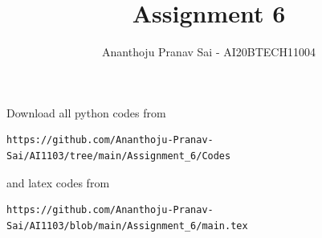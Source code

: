 \documentclass[journal,12pt,twocolumn]{IEEEtran}
\DeclareMathOperator*{\Res}{Res}
\begin{document}
\newcommand{\BEQA}{\begin{eqnarray}}
\newcommand{\EEQA}{\end{eqnarray}}
\newcommand{\define}{\stackrel{\triangle}{=}}

\raggedbottom
\setlength{\parindent}{0pt}
\providecommand{\mbf}{\mathbf}
\providecommand{\pr}[1]{\ensuremath{\Pr\left(#1\right)}}
\providecommand{\qfunc}[1]{\ensuremath{Q\left(#1\right)}}
\providecommand{\sbrak}[1]{\ensuremath{{}\left[#1\right]}}
\providecommand{\lsbrak}[1]{\ensuremath{{}\left[#1\right.}}
\providecommand{\rsbrak}[1]{\ensuremath{{}\left.#1\right]}}
\providecommand{\brak}[1]{\ensuremath{\left(#1\right)}}
\providecommand{\lbrak}[1]{\ensuremath{\left(#1\right.}}
\providecommand{\rbrak}[1]{\ensuremath{\left.#1\right)}}
\providecommand{\cbrak}[1]{\ensuremath{\left\{#1\right\}}}
\providecommand{\lcbrak}[1]{\ensuremath{\left\{#1\right.}}
\providecommand{\rcbrak}[1]{\ensuremath{\left.#1\right\}}}
\theoremstyle{remark}
\newtheorem{rem}{Remark}
\newcommand{\sgn}{\mathop{\mathrm{sgn}}}
\providecommand{\abs}[1]{\vert#1\vert}
\providecommand{\res}[1]{\Res\displaylimits_{#1}} 
\providecommand{\norm}[1]{\lVert#1\rVert}
\providecommand{\mtx}[1]{\mathbf{#1}}
\providecommand{\mean}[1]{E[ #1 ]}
\providecommand{\fourier}{\overset{\mathcal{F}}{ \rightleftharpoons}}
\providecommand{\system}{\overset{\mathcal{H}}{ \longleftrightarrow}}
\newcommand{\solution}{\noindent \textbf{Solution: }}
\newcommand{\cosec}{\,\text{cosec}\,}
\providecommand{\dec}[2]{\ensuremath{\overset{#1}{\underset{#2}{\gtrless}}}}
\newcommand{\myvec}[1]{\ensuremath{\begin{pmatrix}#1\end{pmatrix}}}
\newcommand{\mydet}[1]{\ensuremath{\begin{vmatrix}#1\end{vmatrix}}}
\makeatletter
{}
\makeatother
\let\StandardTheFigure\thefigure
\let\vec\mathbf
\renewcommand{\thefigure}{\theproblem}
\def\putbox#1#2#3{\makebox[0in][l]{\makebox[#1][l]{}\raisebox{\baselineskip}[0in][0in]{\raisebox{#2}[0in][0in]{#3}}}}
     \def\rightbox#1{\makebox[0in][r]{#1}}
     \def\centbox#1{\makebox[0in]{#1}}
     \def\topbox#1{\raisebox{-\baselineskip}[0in][0in]{#1}}
     \def\midbox#1{\raisebox{-0.5\baselineskip}[0in][0in]{#1}}
\vspace{3cm}
\title{Assignment 6}
\author{Ananthoju Pranav Sai - AI20BTECH11004}
\maketitle
\newpage
\bigskip
\renewcommand{\thefigure}{\theenumi}
\renewcommand{\thetable}{\theenumi}
Download all python codes from 
\begin{lstlisting}
https://github.com/Ananthoju-Pranav-Sai/AI1103/tree/main/Assignment_6/Codes
\end{lstlisting}
%
and latex codes from 
%
\begin{lstlisting}
https://github.com/Ananthoju-Pranav-Sai/AI1103/blob/main/Assignment_6/main.tex
\end{lstlisting}
\end{document}
